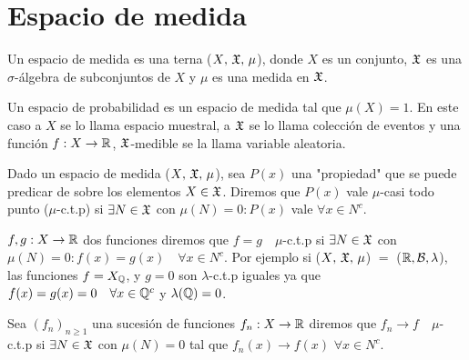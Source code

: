 \section{Espacio de medida}

\begin{definition}
    Un espacio de medida es una terna ($X\text{, } \mathfrak{X}\text{, } \mu$), donde $X$ es un conjunto, $\mathfrak{X}$ es una $\sigma$-álgebra de subconjuntos de $X$ y $\mu$ es una medida en $\mathfrak{X}$.
\end{definition}

Un espacio de probabilidad es un espacio de medida tal que $\mu(X) = 1$.
En este caso a $X$ se lo llama espacio muestral, a $\mathfrak{X}$ se lo llama colección de eventos y
una función $f: X \to \mathbb{R}$, $\mathfrak{X}$-medible se la llama variable aleatoria.

\begin{definition}
    Dado un espacio de medida ($X\text{, } \mathfrak{X}\text{, } \mu$), sea $P(x)$ una "propiedad" que se puede predicar de sobre los elementos $X \in \mathfrak{X}$.
    Diremos que $P(x)$ vale $\mu$-casi todo punto ($\mu$-c.t.p) si $\exists N \in \mathfrak{X}$ con $\mu(N) = 0 : P(x)$ vale $\forall x \in N^c$.
\end{definition}

\begin{eg}
    $f, g : X \to \mathbb{R}$ dos funciones diremos que $f = g \quad \mu$-c.t.p si $\exists N \in \mathfrak{X}$ con $\mu(N) = 0 : f(x) = g(x) \quad \forall x \in N^c$.
    Por ejemplo si ($X\text{, } \mathfrak{X}\text{, } \mu$) $=$ ($\mathbb{R}, \mathcal{B}, \lambda $), las funciones $f = X_{\mathbb{Q}}$, y $g = 0$ son $\lambda$-c.t.p iguales ya que
    $f(x) = g(x) = 0 \quad \forall x \in \mathbb{Q}^c$ y $\lambda(\mathbb{Q}) = 0$.
\end{eg}

\begin{eg}
    Sea $(f_n)_{n \geq 1}$ una sucesión de funciones $f_n : X \to \mathbb{R}$ diremos que $f_n \to f \quad \mu$-c.t.p si $\exists N \in \mathfrak{X}$ con $\mu(N) = 0$ tal que
    $f_n(x) \to f(x)$ $\forall x \in N^c$.
\end{eg}

